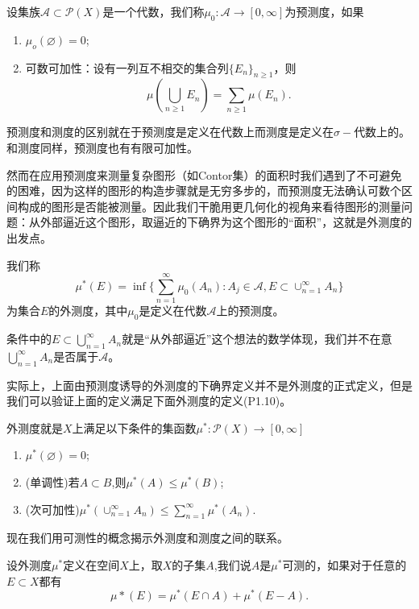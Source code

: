\documentclass[lang=cn,10pt]{elegantbook}
\begin{document}
	\begin{definition}[预测度]
		设集族\(\mathcal{A}\subset \mathcal{P}(X)\)是一个代数，我们称\(\mu_0:\mathcal{A}\to [0,\infty]\)为预测度，如果
		\begin{enumerate}
			\item \(\mu_o(\varnothing)=0\);
			\item 可数可加性：设有一列互不相交的集合列\(\{E_n\}_{n\ge 1}\)，则
			\[\mu(\bigcup_{n\ge 1}E_n)=\sum_{n\ge 1}\mu(E_n).\]
		\end{enumerate}
	\end{definition}
	\begin{note}
		预测度和测度的区别就在于预测度是定义在代数上而测度是定义在\(\sigma-\)代数上的。和测度同样，预测度也有有限可加性。
	\end{note}
	然而在应用预测度来测量复杂图形（如Contor集）的面积时我们遇到了不可避免的困难，因为这样的图形的构造步骤就是无穷多步的，而预测度无法确认可数个区间构成的图形是否能被测量。因此我们干脆用更几何化的视角来看待图形的测量问题：从外部逼近这个图形，取逼近的下确界为这个图形的“面积”，这就是外测度的出发点。
	\begin{definition}[预测度诱导的外测度]
		我们称
		\[\mu^*(E)=\inf\{\sum_{n=1}^{\infty}\mu_0(A_n):A_j\in \mathcal{A},E\subset \cup_{n=1}^\infty A_n\}\]
		为集合\(E\)的外测度，其中\(\mu_0\)是定义在代数\(\mathcal{A}\)上的预测度。
	\end{definition}
	\begin{note}
		条件中的\(E\subset \bigcup_{n=1}^\infty A_n\)就是“从外部逼近”这个想法的数学体现，我们并不在意\(\bigcup_{n=1}^\infty A_n\)是否属于\(\mathcal{A}\)。
	\end{note}
	实际上，上面由预测度诱导的外测度的下确界定义并不是外测度的正式定义，但是我们可以验证上面的定义满足下面外测度的定义(P1.10)。
	\begin{definition}[外测度]
		外测度就是\(X\)上满足以下条件的集函数\(\mu^*:\mathcal{P}(X)\to [0,\infty]\)
		\begin{enumerate}
			\item \(\mu^*(\varnothing)=0\);
			\item (单调性)若\(A\subset B\),则\(\mu^*(A)\le \mu^*(B)\);
			\item (次可加性)\(\mu^*(\cup_{n=1}^\infty A_n)\le \sum_{n=1}^{\infty}\mu^*(A_n)\).
		\end{enumerate}
	\end{definition}
	现在我们用可测性的概念揭示外测度和测度之间的联系。
	\begin{definition}[\(\mu^*\)可测性]
		设外测度\(\mu^*\)定义在空间\(X\)上，取\(X\)的子集\(A\),我们说\(A\)是\(\mu^*\)可测的，如果对于任意的\(E\subset X\)都有
		\[\mu*(E)=\mu^*(E\cap A)+\mu^*(E-A).\]
	\end{definition}
\end{document}
